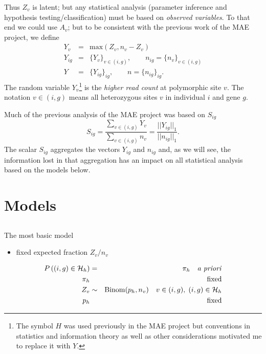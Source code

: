 \documentclass[letterpaper]{article}
\begin{document}
Thus \(Z_v\) is latent; but any statistical analysis (parameter inference and hypothesis
testing/classification) must be based on \emph{observed variables}.  To that
end we could use \(A_v\); but to be consistent with the previous work of the
MAE project, we define 
\begin{eqnarray}
\label{eq:Y-def}
Y_{v} &=& \mathrm{max}(Z_{v}, n_{v} - Z_{v}) \\
Y_{ig} &=&  \{Y_v\}_{v\in(i,g)}, \qquad n_{ig} = \{n_v\}_{v\in(i,g)} \\
Y &=&  \{Y_{ig}\}_{ig}, \qquad n = \{n_{ig}\}_{ig}.
\end{eqnarray}
The random variable \(Y_v\)\footnote{The symbol \(H\) was used previously in
the MAE project but conventions in statistics and information theory as well
as other considerations motivated me to replace it with \(Y\).} is the
\emph{higher read count} at polymorphic site \(v\).  The notation
\(v\in(i,g)\) means all heterozygous sites \(v\) in individual \(i\) and gene
\(g\).

Much of
the previous analysis of the MAE project was based on \(S_{ig}\)
\begin{equation}
S_{ig} = \frac{\sum_{v\in(i,g)} Y_v}{ \sum_{v\in(i,g)} n_v} =
\frac{||Y_{ig}||_1}{||n_{ig}||_1}.
\end{equation}
The scalar \(S_{ig}\) aggregates the vectors \(Y_{ig}\) and \(n_{ig}\) and,
as we will see, the information lost in that aggregation has an impact on all
statistical analysis based on the models below.

\section{Models}
\label{sec:models}

\subsection{}
\label{sec:model-basic}

The most basic model
\begin{itemize}
\item fixed expected fraction \(Z_v/n_v\)
\end{itemize}

\begin{eqnarray}
\label{eq:hypothesis-prior}
P\left( (i,g) \in \mathcal{H}_h \right) &=& \pi_h \quad \text{\emph{a priori}} \\
\label{eq:fixed-hypothesis-prior}
\pi_h && \text{fixed} \\
\label{eq:binom}
Z_v &\sim& \mathrm{Binom}(p_h, n_v) \quad v\in(i,g), \; (i,g)\in \mathcal{H}_h \\
\label{eq:fixed_pi-p}
p_h && \mathrm{fixed}
\end{eqnarray}
\end{document}
